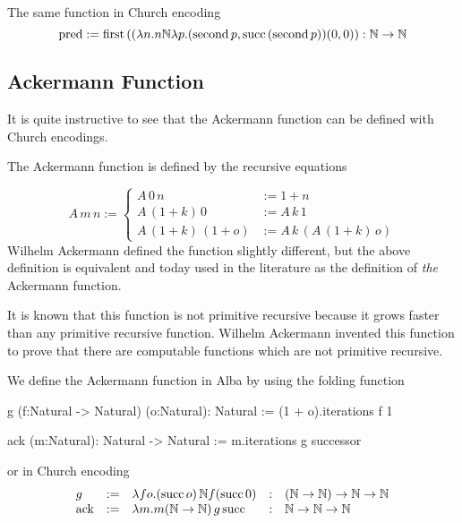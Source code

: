 The same function in Church encoding
$$
\text{pred} :=
\text{first}\,
((\lambda n . n {\mathbb{N}} \lambda p. (\text{second}\, p, \text{succ}\,
(\text{second}\, p))
(0,0))
: {\mathbb{N}} \to {\mathbb{N}}
$$



\subsection{Ackermann Function}

It is quite instructive to see that the Ackermann function can be defined with
Church encodings.

The Ackermann function is defined by the recursive equations

$$
A \, m \, n :=
\begin{cases}
  A\, 0\, n &:= 1 + n
  \\
  A\, (1+k)\, 0 &:= A\, k\, 1
  \\
  A\, (1+k)\, (1+o) & := A\, k\, (A\, (1+k)\, o)
\end{cases}
$$
%
Wilhelm Ackermann defined the function slightly different, but the above
definition is equivalent and today used in the literature as the definition of
\emph{the} Ackermann function.

It is known that this function is not primitive recursive because it grows
faster than any primitive recursive function. Wilhelm Ackermann invented this
function to prove that there are computable functions which are not primitive
recursive.

We define the Ackermann function in Alba by using the folding function

\begin{alba}
  g (f:Natural -> Natural) (o:Natural): Natural :=
    (1 + o).iterations f 1

  ack (m:Natural): Natural -> Natural :=
    m.iterations g successor
\end{alba}

or in Church encoding
$$
\begin{array}{lllll}
  g &:=
  & \lambda f o . (\text{succ}\, o)\, \Natural f (\text{succ}\, 0)
  &:& (\Natural \to \Natural) \to \Natural \to \Natural

  \\

  \text{ack} &:=
  & \lambda m. m (\Natural\to\Natural)\, g\, \text{succ}
  &:& \Natural \to \Natural \to \Natural

\end{array}
$$

